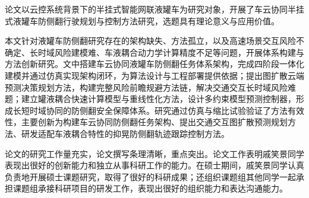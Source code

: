 
\begin{comments}
    论文以云控系统背景下的半挂式智能网联液罐车为研究对象，开展了车云协同半挂式液罐车防侧翻行驶规划与控制方法研究，选题具有理论意义与应用价值。

    本文针对液罐车防侧翻研究存在的架构缺失、方法孤立，以及高速场景交互风险不确定、长时域风险建模难、车液耦合动力学计算精度不足等问题，开展体系构建与方法创新研究。文中搭建车云协同液罐车防侧翻任务体系架构，完成四阶段一体化建模并通过仿真实现架构闭环，为算法设计与工程部署提供依据；提出图扩散云端预测决策规划方法，构建完整风险前瞻规避方法链，解决交通交互长时域风险难题；建立罐液耦合快速计算模型与重线性化方法，设计多约束模型预测控制器，形成长短时域协同的防侧翻安全保障体系。研究通过仿真与缩比试验验证了方法有效性，主要创新为构建车云协同防侧翻任务架构、提出交通交互图扩散预测规划方法、研发适配车液耦合特性的抑晃防侧翻轨迹跟踪控制方法。

    论文的研究工作量充实，论文撰写条理清晰，重点突出。论文工作表明戚笑景同学表现出很好的创新能力和独立从事科研工作的能力。在硕士期间，戚笑景同学认真负责地开展硕士课题研究，取得了很好的科研成果；还组织课题组其他同学一起承担课题组承接科研项目的研发工作，表现出很好的组织能力和表达沟通能力。

\end{comments}
